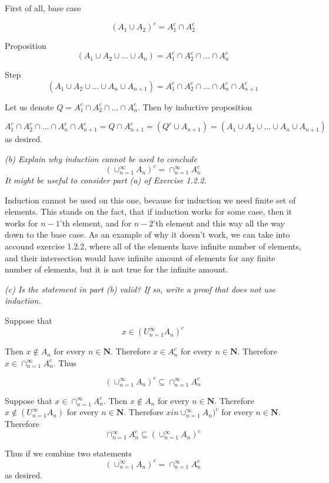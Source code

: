 \documentclass[11pt,oneside,titlepage]{book}
\begin{document}
First of all, base case

$$ (A_1 \cup A_2)^c = A^c_1 \cap A^c_2 $$

Proposition
$$ (A_1 \cup A_2 \cup ... \cup A_n) = A^c_1 \cap A^c_2 \cap ... \cap A^c_n$$

Step
$$ (A_1 \cup A_2 \cup ... \cup A_n \cup A_{n + 1}) = A^c_1 \cap A^c_2 \cap ... \cap A^c_n \cap A^c_{n + 1}$$

Let us denote $Q = A^c_1 \cap A^c_2 \cap ... \cap A^c_n$. Then by inductive
proposition

$$  A^c_1 \cap A^c_2 \cap ... \cap A^c_n \cap A^c_{n + 1} = Q \cap A^c_{n + 1}
= (Q^c \cup A_{n + 1}) = (A_1 \cup A_2 \cup ... \cup A_n \cup A_{n + 1})
$$
as desired.

\textit{(b) Explain why induction cannot be used to conclude }
$$(\cup^{\infty}_{n = 1}A_n)^c = \cap^{\infty}_{n = 1}A^c_n$$
\textit{It might be useful to consider part (a) of Exercise 1.2.2.}

Induction cannot be used on this one, because for induction we need finite
set of elements. This stands on the fact, that if induction works for
some case, then it works for $n - 1$'th element, and for $n - 2$'th element
and this way all the way down to the base case. As an example of why it doesn't
work, we can take into accound exercise 1.2.2, where all of the elements have
infinite number of elements, and their intersection would have infinite amount
of elements  for any finite number of elements, but it is not true for the
infinite amount.

\textit{(c) Is the statement in part (b) valid? If so, write a proof that does
  not use induction.}

Suppose that
$$x \in (U^{\infty}_{n = 1}A_n)^c$$

Then $x \notin A_n$ for every $n \in \textbf{N}$. Therefore
$x \in A^c_n$ for every $n \in \textbf{N}$.
Therefore $x \in \cap^{\infty}_{n = 1}A^c_n$. Thus

$$(\cup^{\infty}_{n = 1}A_n)^c \subseteq \cap^{\infty}_{n = 1}A^c_n$$

Suppose that $x \in \cap^{\infty}_{n = 1}A^c_n$. Then $x \notin A_n$
for every $n \in \textbf{N}$. Therefore $x \notin (U^{\infty}_{n = 1}A_n)$
for every $n \in \textbf{N}$. Therefore $x in \cup^{\infty}_{n = 1}A_n)^c$
for every $n \in \textbf{N}$. Therefore
$$ \cap^{\infty}_{n = 1}A^c_n \subseteq  (\cup^{\infty}_{n = 1}A_n)^c$$

Thus if we combine two statements
$$(\cup^{\infty}_{n = 1}A_n)^c = \cap^{\infty}_{n = 1}A^c_n$$
as desired.
\end{document}
